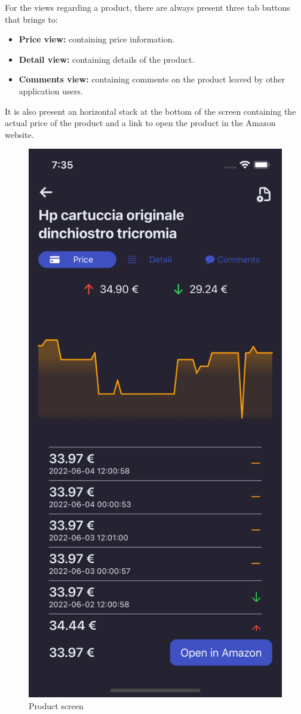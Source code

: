 For the views regarding a product, there are always present three tab buttons that brings to:
\begin{itemize}
    \item \textbf{Price view:} containing price information.
    \item \textbf{Detail view:} containing details of the product.
    \item \textbf{Comments view:} containing comments on the product leaved by other application users.
\end{itemize}
It is also present an horizontal stack at the bottom of the screen containing the actual price of the product and a link to open the product in the Amazon website.
\begin{figure}[h!]
        \centering
        \includegraphics[scale=0.15]{images/interfaces/product_screen.png}
        \caption{Product screen}
        \label{fig:product_screen}
\end{figure}
